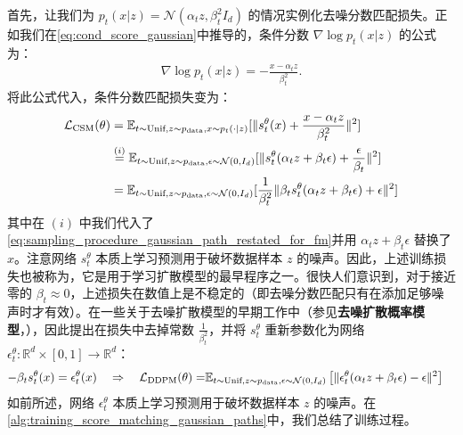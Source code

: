 \begin{examplebox}
首先，让我们为 $p_t(x|z)=\mathcal{N}(\alpha_tz,\beta_t^2I_d)$ 的情况实例化去噪分数匹配损失。正如我们在\cref{eq:cond_score_gaussian}中推导的，条件分数 $\nabla\log p_t(x|z)$ 的公式为：
\begin{align}
\label{e:marginal_vf_cond_score_restated}
    \nabla\log p_t(x|z) = -\frac{x-\alpha_t z}{\beta_t^2}.
\end{align}
将此公式代入，条件分数匹配损失变为：
\begin{align*}
        \mathcal{L}_{\text{CSM}}(\theta) &=\mathbb{E}_{t\sim\text{Unif},z\sim p_{\rm{data}}, x\sim p_t(\cdot|z)}[\|s_t^\theta(x)+\frac{x-\alpha_t z}{\beta_t^2}\|^2]\\&\overset{(i)}{=}\mathbb{E}_{t\sim\text{Unif},z\sim p_{\rm{data}}, \epsilon\sim \mathcal{N}(0,I_d)}[\|s_t^\theta(\alpha_tz+\beta_t\epsilon)+\frac{\epsilon}{\beta_t}\|^2]\\
        &=\mathbb{E}_{t\sim\text{Unif},z\sim p_{\rm{data}}, \epsilon\sim \mathcal{N}(0,I_d)}[\frac{1}{\beta_t^2}\|\beta_ts_t^\theta(\alpha_tz+\beta_t\epsilon)+\epsilon\|^2]
\end{align*}
其中在 $(i)$ 中我们代入了\cref{eq:sampling_procedure_gaussian_path_restated_for_fm}并用 $\alpha_tz+\beta_t\epsilon$ 替换了 $x$。注意网络 $s_t^\theta$ 本质上学习预测用于破坏数据样本 $z$ 的噪声。因此，上述训练损失也被称为，它是用于学习扩散模型的最早程序之一。很快人们意识到，对于接近零的 $\beta_t\approx 0$，上述损失在数值上是不稳定的（即去噪分数匹配只有在添加足够噪声时才有效）。在一些关于去噪扩散模型的早期工作中（参见\textbf{去噪扩散概率模型}，\citep{ho2020denoising}），因此提出在损失中去掉常数 $\frac{1}{\beta_t^2}$，并将 $s_t^\theta$ 重新参数化为网络 $\epsilon_t^\theta:\mathbb{R}^d\times[0,1]\to\mathbb{R}^d$：
\begin{align*}
    -\beta_t s_t^\theta(x) = \epsilon_t^\theta(x)\quad \Rightarrow \quad \mathcal{L}_{\text{DDPM}}(\theta) =&\mathbb{E}_{t\sim\text{Unif},z\sim p_{\rm{data}}, \epsilon\sim \mathcal{N}(0,I_d)}\left[\|\epsilon_t^\theta(\alpha_tz+\beta_t\epsilon)-\epsilon\|^2\right]
\end{align*}
如前所述，网络 $\epsilon_t^\theta$ 本质上学习预测用于破坏数据样本 $z$ 的噪声。在\cref{alg:training_score_matching_gaussian_paths}中，我们总结了训练过程。
\end{examplebox}

